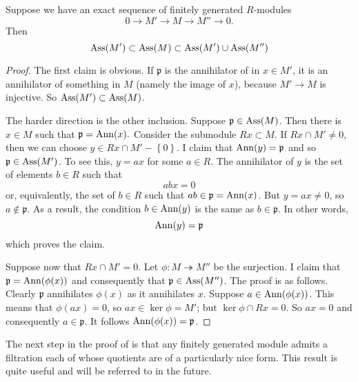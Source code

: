 \begin{lemma} \label{assexact} 
Suppose we have an exact sequence of finitely generated $R$-modules
\[ 0 \to M' \to M \to M'' \to 0.  \]
Then 
\[\operatorname{Ass}(M') \subset \operatorname{Ass}(M) \subset \operatorname{Ass}(M') \cup \operatorname{Ass}(M'')  \]
\end{lemma} 
\begin{proof} 
The first claim is obvious. If $\mathfrak{p}$ is the annihilator of
in $x \in M'$, it is an annihilator of something in $M$ (namely the image of
$x$), because
$M' \to M$ is injective. So $\operatorname{Ass}(M') \subset \operatorname{Ass}(M)$. 

The harder direction is the other inclusion. Suppose $\mathfrak{p} \in \operatorname{Ass}(M)$.
Then there is $x \in M$ such that
$\mathfrak{p} = \operatorname{Ann}(x).$
Consider the submodule $Rx \subset M$.  If $Rx \cap M' \neq 0$, then we can
choose $y \in Rx \cap M' - \left\{0\right\}$. I claim that $\operatorname{Ann}(y) =
\mathfrak{p}$ and so $\mathfrak{p} \in \operatorname{Ass}(M')$.
To see this, $ y = ax$ for some $a \in R$. The annihilator of $y$ is the set of elements
$b \in R$ such that
\[ abx = 0  \]
or, equivalently, the set of $b \in R$ such that $ab \in \mathfrak{p} =
\operatorname{Ann}(x)$. But $y = ax \neq 0$, so $a \notin \mathfrak{p}$. As a
result, the condition $b \in \operatorname{Ann}(y)$ is the same as $b \in \mathfrak{p}$. In
other words, 
\[ \operatorname{Ann}(y) = \mathfrak{p}  \]
which proves the claim.

Suppose now that  $Rx \cap M' = 0$. Let $\phi: M \twoheadrightarrow M''$
be the surjection. I claim that $\mathfrak{p} = \operatorname{Ann}(\phi(x))$ and
consequently that
$\mathfrak{p} \in \operatorname{Ass}(M'')$.  The proof is as follows. Clearly $\mathfrak{p}$
annihilates $\phi(x)$ as it annihilates $x$. Suppose $a \in \operatorname{Ann}(\phi(x))$.
This means that $\phi(ax) = 0$, so $ax \in \ker \phi=M'$; but $\ker \phi \cap Rx =
0$. So $ax = 0$ and consequently $a \in \mathfrak{p}$. It follows $\operatorname{Ann}(\phi(x)) = \mathfrak{p}$. 
\end{proof} 

The next step in the proof of  is that any
finitely generated module
admits a filtration each of whose quotients are of a particularly nice form.
This result is quite useful and will be referred to in the future.

